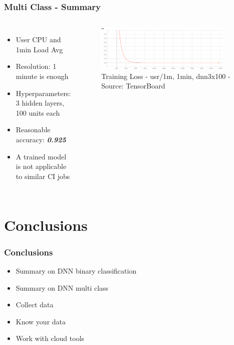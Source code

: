 \documentclass[aspectratio=169,11pt,hyperref={colorlinks=true}]{beamer}
\begin{document}
\begin{frame}
    \frametitle{Multi Class - Summary}
    \begin{columns}
        \begin{itemize}
            \item{User CPU and 1min Load Avg}
            \item{Resolution: 1 minute is enough}
            \item{Hyperparameters: 3 hidden layers, 100 units each}
            \item{Reasonable accuracy: \emph{\textbf{0.925}}}
            \item{A trained model is not applicable to similar CI jobs}
        \end{itemize}
        \begin{figure}
          \begin{center}
            \includegraphics[width=0.9\textwidth,height=0.5\textheight]{graphs/cpu_1m-1min-dnn3x100-node_provider-loss_curve.png}
              \caption{Training Loss - usr/1m, 1min, dnn3x100 - Source: TensorBoard}
          \end{center}
        \end{figure}
      \end{columns}
\end{frame}

\section{Conclusions}
\begin{frame}
  \frametitle{Conclusions}
  \begin{itemize}
      \item{Summary on DNN binary classification}
      \item{Summary on DNN multi class}
      \item{Collect data}
      \item{Know your data}
      \item{Work with cloud tools}
  \end{itemize}
\end{frame}
\end{document}
